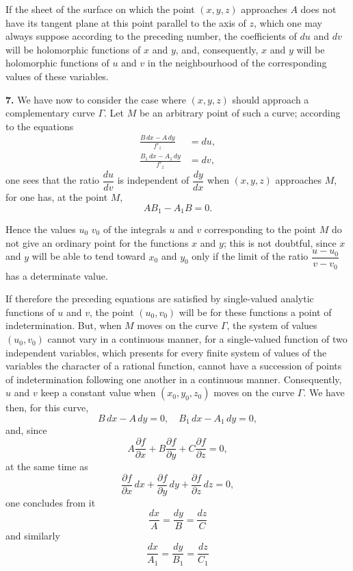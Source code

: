 \documentclass{article}
\begin{document}
If the sheet of the surface on which the point $(x, y, z)$ approaches $A$ does not have its tangent plane at this point parallel to the axis of $z$, which one may always suppose according to the preceding number, the coefficients of $du$ and $dv$ will be holomorphic functions of $x$ and $y$, and, consequently, $x$ and $y$ will be holomorphic functions of $u$ and $v$ in the neighbourhood of the corresponding values of these variables.

\textbf{7.} We have now to consider the case where $(x, y, z)$ should approach a complementary curve $\Gamma$. Let $M$ be an arbitrary point of such a curve; according to the equations
\[
\begin{aligned}
\frac{B\,dx - A\,dy}{f'_{z}} &= du, \\
\frac{B_{1}\,dx - A_{1}\,dy}{f'_{z}} &= dv,
\end{aligned}
\]
one sees that the ratio $\dfrac{du}{dv}$ is independent of $\dfrac{dy}{dx}$ when $(x, y, z)$ approaches $M$, for one has, at the point $M$,
\[
AB_{1} - A_{1}B = 0.
\]


Hence the values $u_{0}$ $v_{0}$ of the integrals $u$ and $v$ corresponding to the point $M$ do not give an ordinary point for the functions $x$ and $y$; this is not doubtful, since $x$ and $y$ will be able to tend toward $x_{0}$ and $y_{0}$ only if the limit of the ratio $\dfrac{u - u_{0}}{v - v_{0}}$ has a determinate value.

If therefore the preceding equations are satisfied by single-valued analytic functions of $u$ and $v$, the point $(u_{0}, v_{0})$ will be for these functions a point of indetermination. But, when $M$ moves on the curve $\Gamma$, the system of values $(u_{0}, v_{0})$ cannot vary in a continuous manner, for a single-valued function of two independent variables, which presents for every finite system of values of the variables the character of a rational function, cannot have a succession of points of indetermination following one another in a continuous manner. Consequently, $u$ and $v$ keep a constant value when $(x_{0}, y_{0}, z_{0})$ moves on the curve $\Gamma$. We have then, for this curve,
\[
B\,dx - A\,dy = 0, \quad B_{1}\,dx - A_{1}\,dy = 0,
\]
and, since
\[
A \frac{\partial f}{\partial x} + B \frac{\partial f}{\partial y} + C \frac{\partial f}{\partial z} = 0,
\]
at the same time as
\[
\frac{\partial f}{\partial x}\,dx + \frac{\partial f}{\partial y}\,dy + \frac{\partial f}{\partial z}\,dz = 0,
\]
one concludes from it
\[
\frac{dx}{A} = \frac{dy}{B} = \frac{dz}{C}
\]
and similarly
\[
\frac{dx}{A_{1}} = \frac{dy}{B_{1}} = \frac{dz}{C_{1}}
\]
\end{document}
